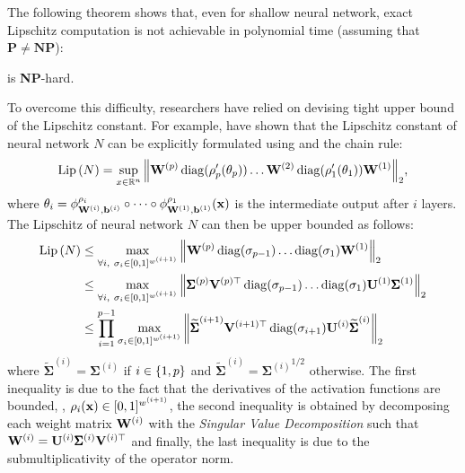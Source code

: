 \noindent
The following theorem shows that, even for shallow neural network, exact Lipschitz computation is not achievable in polynomial time (assuming that $\mathbf{P} \neq \textbf{NP}$):
\begin{theorem}
   is \textbf{NP}-hard.
\end{theorem}


\noindent
To overcome this difficulty, researchers have relied on devising tight upper bound of the Lipschitz constant.
For example, \citet{scaman2018lipschitz} have shown that the Lipschitz constant of neural network $N$ can be explicitly formulated using  and the chain rule:
\begin{equation}
  \operatorname{Lip}{(N)} = \sup_{x \in \mathbb{R}^n} \norm{\mathbf{W}^{(p)} \operatorname*{diag}(\rho'_p(\theta_p)) \dots \mathbf{W}^{(2)} \operatorname*{diag}(\rho'_1(\theta_1)) \mathbf{W}^{(1)}}_2,
  \label{equation:ch3-decomposition_jacobian_lipschitz}
\end{equation}
where $\theta_i = \phi^{\rho_i}_{\mathbf{W}^{(i)}, \mathbf{b}^{(i)}} \circ \cdots \circ \phi^{\rho_1}_{\mathbf{W}^{(1)}, \mathbf{b}^{(1)}}(\mathbf{x})$ is the intermediate output after $i$ layers.
The Lipschitz of neural network $N$ can then be upper bounded as follows:
\begin{align}
  \operatorname{Lip}{(N)} &\leq \max_{\forall i,\ \sigma_i \in [0, 1]^{w^{(i+1)}}} \norm{\mathbf{W}^{(p)} \operatorname*{diag}(\sigma_{p-1}) \dots \operatorname*{diag}(\sigma_1) \mathbf{W}^{(1)}}_2 \notag \\
  &\leq \max_{\forall i,\ \sigma_i \in [0, 1]^{w^{(i+1)}}} \norm{ \pmb{\Sigma}^{(p)} \mathbf{V}^{(p)\top} \operatorname*{diag}(\sigma_{p-1}) \dots \operatorname*{diag}(\sigma_1) \mathbf{U}^{(1)} \pmb{\Sigma}^{(1)}}_2 \notag \\
  &\leq \prod_{i=1}^{p-1} \max_{\sigma_i \in [0, 1]^{w^{(i+1)}}} \norm{\widetilde{\pmb{\Sigma}}^{(i+1)} \mathbf{V}^{(i+1)\top} \operatorname*{diag}(\sigma_{i+1}) \mathbf{U}^{(i)} \widetilde{\pmb{\Sigma}}^{(i)}}_2 
\end{align}
where $\widetilde{\pmb{\Sigma}}^{(i)} = \pmb{\Sigma}^{(i)}$ if $i \in \{1, p\}$ and $\widetilde{\pmb{\Sigma}}^{(i)} = {\pmb{\Sigma}^{(i)}}^{1/2}$ otherwise.
The first inequality is due to the fact that the derivatives of the activation functions are bounded, \ie, $\rho_i(\mathbf{x}) \in [0, 1]^{w^{(i+1)}}$, the second inequality is obtained by decomposing each weight matrix $\mathbf{W}^{(i)}$ with the \emph{Singular Value Decomposition} such that $\mathbf{W}^{(i)} = \mathbf{U}^{(i)} \pmb{\Sigma}^{(i)} \mathbf{V}^{(i)\top}$ and finally, the last inequality is due to the submultiplicativity of the operator norm.
